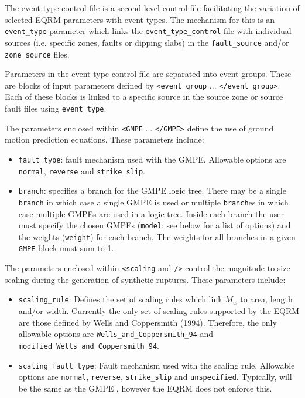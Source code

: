 The event type control file is a second level control file
facilitating the variation of selected EQRM parameters with event
types. The mechanism for this is an \texttt{event\_type} parameter
which links the \texttt{event\_type\_control} file with individual
sources (i.e. specific zones, faults or dipping slabs) in the
\texttt{fault\_source} and/or \texttt{zone\_source} files.


Parameters in the event type control file are separated into event
groups. These are blocks of input parameters defined by
\texttt{<event\_group} ... \texttt{</event\_group>}. Each of these
blocks is linked to a specific source in the source zone or source
fault files using \texttt{event\_type}.

The parameters enclosed within \texttt{<GMPE} ... \texttt{</GMPE>}
define the use of ground motion prediction equations. These
parameters include:
\begin{itemize}
\item \texttt{fault\_type}: fault mechanism used with the GMPE.
Allowable options are \texttt{normal}, \texttt{reverse} and
\texttt{strike\_slip}.
\item \texttt{branch}: specifies a branch for the GMPE logic tree.
There may be a single \texttt{branch} in which case a single GMPE is
used or multiple \texttt{branch}es in which case multiple GMPEs are
used in a logic tree. Inside each branch the user must specify the
chosen GMPEs (\texttt{model}: see below for a list of options) and
the weights (\texttt{weight}) for each branch. The weights
for all branches in a given \texttt{GMPE} block must sum to 1.
\end{itemize}

The parameters enclosed within \texttt{<scaling} and \texttt{/>}
 control the magnitude to size scaling during the generation of
 synthetic ruptures. These parameters include:
\begin{itemize}

\item \texttt{scaling\_rule}: Defines the set of scaling rules which
  link $M_w$ to area, length and/or width. Currently the only set of
  scaling rules supported by the EQRM are those defined by Wells and
  Coppersmith (1994). Therefore, the only allowable options are
  \texttt{Wells\_and\_Coppersmith\_94} and
  \texttt{modified\_Wells\_and\_Coppersmith\_94}.

\item \texttt{scaling\_fault\_type}: Fault mechanism used with the scaling rule.
Allowable options are \texttt{normal}, \texttt{reverse},
\texttt{strike\_slip} and \texttt{unspecified}. Typically,
 will be the same as the GMPE
, however the EQRM does not enforce this.  \\
\end{itemize}


